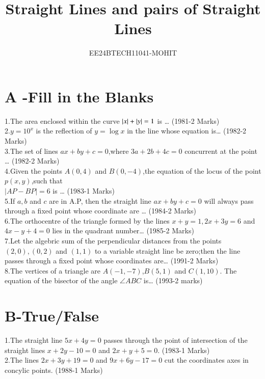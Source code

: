\documentclass[journal,12pt,twocolumn]{IEEEtran}
\theoremstyle{remark}
\begin{document}

\vspace{3cm}

\title{Straight Lines and pairs of Straight Lines}
\author{EE24BTECH11041-MOHIT}
\maketitle
\newpage
\bigskip

\renewcommand{\thefigure}{\theenumi}
\renewcommand{\thetable}{\theenumi}

\section {A -Fill in the Blanks}
1.The area enclosed within the curve $\left\vert x\right\vert+\left\vert y\right\vert=1$ is \dots
\hfill(1981-2 Marks)\\
2.$y = 10^x $ is the reflection of $y=\log x$ in the  line whose equation is\dots
\hfill(1982-2 Marks)\\
3.The set of lines $ax+by+c=0$,where $3a+2b+4c=0$ concurrent at the point \dots
\hfill(1982-2 Marks)\\
4.Given the points $A(0,4)$ and $B(0,-4)$,the equation of the locus of the point $p(x,y)$,such that \\
    $|AP-BP|=6$ is \dots
\hfill(1983-1 Marks)\\
5.If $a,b$ and $c$ are in A.P, then the straight line $ax +by +c=0$ will always pass through a fixed point whose coordinate are \dots
\hfill(1984-2 Marks)\\
6.The orthocentre of the triangle formed by the lines $x+y=1,2x +3y=6$ and $4x-y+4=0$ lies in the quadrant number\dots
\hfill(1985-2 Marks)\\
7.Let the algebric sum of the perpendicular distances from the points $(2,0),(0,2)$ and $(1,1)$ to a variable straight line be zero;then the line passes through a fixed point whose coordinates are\dots
\hfill(1991-2 Marks)\\
8.The vertices of a triangle are $A(-1,-7)$,$B(5,1)$ and $C(1,10)$. The equation of the bisector of the angle $\angle{ABC}$ is\dots
\hfill(1993-2 marks)\\
\section {B-True/False}
1.The straight line $5x+4y=0$ passes through the point of intersection of the straight lines $x+2y-10=0$ and $2x+y+5=0$.
\hfill(1983-1 Marks)\\
2.The lines $2x+3y+19=0$ and $9x+6y-17=0$ cut the coordinates axes in concylic points.
\hfill(1988-1 Marks)
\end{document}
